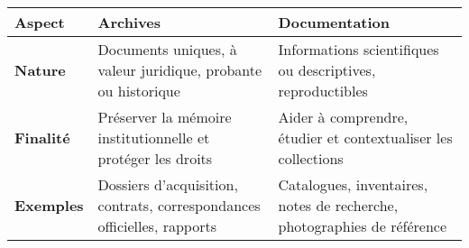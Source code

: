 \begin{tabular}{|l|p{6cm}|p{6cm}|}
	\hline
	\textbf{Aspect} & \textbf{Archives} & \textbf{Documentation} \\
	\hline
	\textbf{Nature} & Documents uniques, à valeur juridique, probante ou historique & Informations scientifiques ou descriptives, reproductibles \\
	\hline
	\textbf{Finalité} & Préserver la mémoire institutionnelle et protéger les droits & Aider à comprendre, étudier et contextualiser les collections \\
	\hline
	\textbf{Exemples} & Dossiers d’acquisition, contrats, correspondances officielles, rapports & Catalogues, inventaires, notes de recherche, photographies de référence \\
	\hline
\end{tabular}
